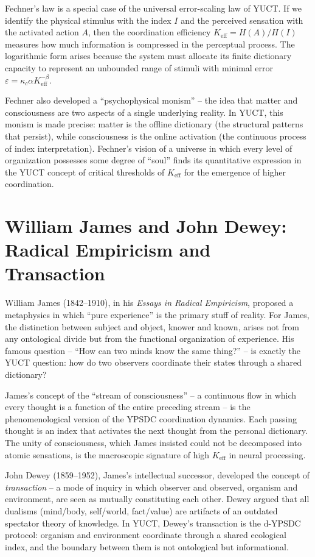\documentclass[12pt,a4paper]{article}
\begin{document}
	Fechner's law is a special case of the universal error-scaling law of YUCT. If we identify the physical stimulus with the index \(I\) and the perceived sensation with the activated action \(A\), then the coordination efficiency \(K_{\mathrm{eff}} = H(A)/H(I)\) measures how much information is compressed in the perceptual process. The logarithmic form arises because the system must allocate its finite dictionary capacity to represent an unbounded range of stimuli with minimal error \(\varepsilon = \kappa_c \alpha K_{\mathrm{eff}}^{-\beta}\).
	
	Fechner also developed a ``psychophysical monism'' -- the idea that matter and consciousness are two aspects of a single underlying reality. In YUCT, this monism is made precise: matter is the offline dictionary (the structural patterns that persist), while consciousness is the online activation (the continuous process of index interpretation). Fechner's vision of a universe in which every level of organization possesses some degree of ``soul'' finds its quantitative expression in the YUCT concept of critical thresholds of \(K_{\mathrm{eff}}\) for the emergence of higher coordination.
	
	\section{William James and John Dewey: Radical Empiricism and Transaction}
	
	William James (1842–1910), in his \emph{Essays in Radical Empiricism}, proposed a metaphysics in which ``pure experience'' is the primary stuff of reality. For James, the distinction between subject and object, knower and known, arises not from any ontological divide but from the functional organization of experience. His famous question -- ``How can two minds know the same thing?'' -- is exactly the YUCT question: how do two observers coordinate their states through a shared dictionary?
	
	James's concept of the ``stream of consciousness'' -- a continuous flow in which every thought is a function of the entire preceding stream -- is the phenomenological version of the YPSDC coordination dynamics. Each passing thought is an index that activates the next thought from the personal dictionary. The unity of consciousness, which James insisted could not be decomposed into atomic sensations, is the macroscopic signature of high \(K_{\mathrm{eff}}\) in neural processing.
	
	John Dewey (1859–1952), James's intellectual successor, developed the concept of \emph{transaction} -- a mode of inquiry in which observer and observed, organism and environment, are seen as mutually constituting each other. Dewey argued that all dualisms (mind/body, self/world, fact/value) are artifacts of an outdated spectator theory of knowledge. In YUCT, Dewey's transaction is the d-YPSDC protocol: organism and environment coordinate through a shared ecological index, and the boundary between them is not ontological but informational.
	
\end{document}
